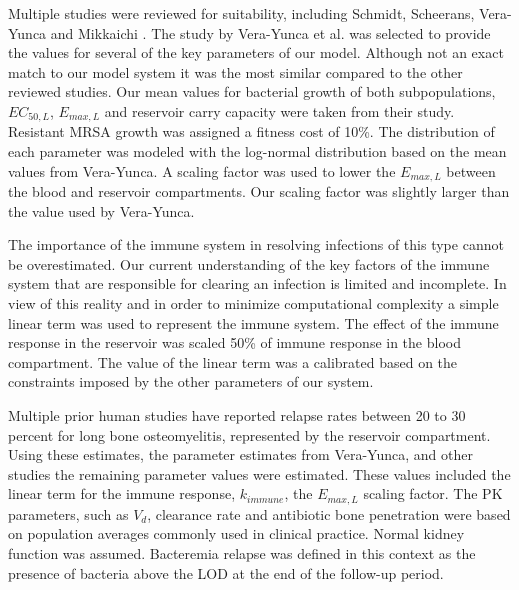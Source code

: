 \documentclass[journal]{IEEEtran}
\begin{document}
Multiple studies were reviewed for suitability, including Schmidt, Scheerans, Vera-Yunca  and Mikkaichi \cite{schmidt2009oxazolidinone,Scheerans2014,VeraYunca2025,Mikkaichi2019}. The study by Vera-Yunca et al. was selected to provide the values for several of the key parameters of our model. Although not an exact match to our model system it was the most similar compared to the other reviewed studies.  Our mean values for bacterial growth of both subpopulations, $EC_{50,L}$, $E_{max,L}$ and reservoir carry capacity were taken from their study. Resistant MRSA growth was assigned a fitness cost of 10\%. The distribution of each parameter was modeled with the log-normal distribution based on the mean values from Vera-Yunca.  A scaling factor was used to lower the $E_{max,L}$ between the blood and reservoir compartments. Our scaling factor was slightly larger than the value used by Vera-Yunca.

The importance of the immune system in resolving infections of this type cannot be overestimated.  Our current understanding of the key factors of the immune system that are responsible for clearing an infection is limited and incomplete.  In view of this reality and in order to minimize computational complexity a simple linear term was used to represent the immune system. The effect of the immune response in the reservoir was scaled 50\% of immune response in the blood compartment.  The value of the linear term was a calibrated based on the constraints imposed by the other parameters of our system.

Multiple prior human studies have reported relapse rates between 20 to 30 percent for long bone osteomyelitis, represented by the reservoir compartment.  Using these estimates, the parameter estimates from Vera-Yunca, and other studies the remaining parameter values were estimated.  These values included the linear term for the immune response, $k_{immune}$, the $E_{max,L}$ scaling factor.  The PK parameters, such as $V_{d}$, clearance rate and antibiotic bone penetration were based on population averages commonly used in clinical practice.  Normal kidney function was assumed.  Bacteremia relapse was defined in this context as the presence of bacteria above the LOD at the end of the follow-up period.
\end{document}

